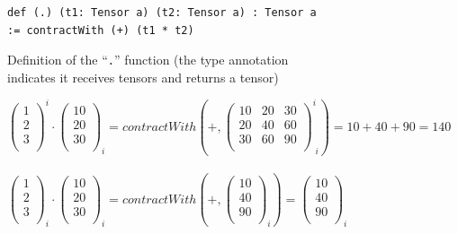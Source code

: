 \begin{figure}[t]
 \begin{subfigure}[b]{1.0\linewidth}
\begin{lstlisting}[language=egison,numbers=none]
def (.) (t1: Tensor a) (t2: Tensor a) : Tensor a := contractWith (+) (t1 * t2)
\end{lstlisting}
  \caption{Definition of the ``\lstinline{.}'' function (the type annotation indicates it receives tensors and returns a tensor)}
  \label{fig:dotDef}
 \end{subfigure}
  \medskip
 \begin{subfigure}[b]{1.0\linewidth}
  {\small
  $\begin{pmatrix} 1 \\ 2 \\ 3 \\ \end{pmatrix}^{i} \cdot \begin{pmatrix} 10 \\ 20 \\ 30 \\ \end{pmatrix}_{i} = contractWith(+, \begin{pmatrix} 10 & 20 & 30 \\ 20 & 40 & 60 \\ 30 & 60 & 90 \\ \end{pmatrix}^{i}_{\;i})
  = 10 + 40 + 90 = 140$
  \\ \medskip \\
  $\begin{pmatrix} 1 \\ 2 \\ 3 \\ \end{pmatrix}_{i} \cdot \begin{pmatrix} 10 \\ 20 \\ 30 \\ \end{pmatrix}_{i} = contractWith(+, \begin{pmatrix} 10 \\ 40 \\ 90 \\ \end{pmatrix}_{i}) = \begin{pmatrix} 10 \\ 40 \\ 90 \\ \end{pmatrix}_{i}$
}
\end{subfigure}
\end{figure}
